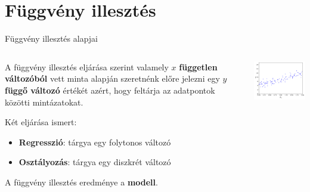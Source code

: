 \documentclass[english, aspectratio=169]{beamer}
\makeatletter
\let\origtableofcontents=\tableofcontents
\def\tableofcontents{\@ifnextchar[{\origtableofcontents}{\gobbletableofcontents}}
\def\gobbletableofcontents#1{\origtableofcontents}
\makeatother
\begin{document}
\section{Függvény illesztés}

\begin{frame}{}
\tableofcontents[currentsection]
\end{frame}

\begin{frame}{Függvény illesztés alapjai}
\begin{columns}
\begin{column}{.5\textwidth}
A függvény illesztés eljárása szerint valamely $x$ \textbf{független változóból} vett minta alapján szeretnénk előre jelezni egy $y$ \textbf{függő változó} értékét azért, hogy feltárja az adatpontok közötti mintázatokat.\par\smallskip
Két eljárása ismert:
\begin{itemize}
	\item \textbf{Regresszió}: tárgya egy folytonos változó
	\item \textbf{Osztályozás}: tárgya egy diszkrét változó
\end{itemize}
A függvény illesztés eredménye a \textbf{modell}.
\end{column}
\begin{column}{.5\textwidth}
\begin{center}
\includegraphics[width=7cm, keepaspectratio]{images/ql_8.png}
\end{center}
\end{column}
\end{columns}
\end{frame}
\end{document}
